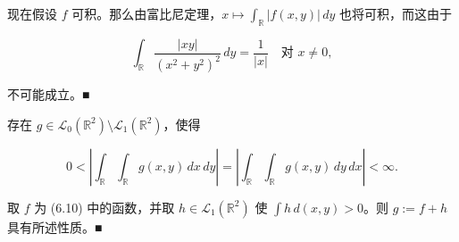 \begin{remark}
\begin{items}
现在假设 $ f $ 可积。那么由富比尼定理，$ x \mapsto \int_{\mathbb{R}}|f(x,y)|\,dy $ 也将可积，而这由于

\[
\int_{\mathbb{R}} \frac{|xy|}{(x^2+y^2)^2}\,dy = \frac{1}{|x|} \quad \text{对 } x \ne 0 ,
\]

不可能成立。\nobreak\hspace{0.35em}■

\item

存在 $ g \in \mathcal{L}_0(\mathbb{R}^2)\setminus\mathcal{L}_1(\mathbb{R}^2) $，使得

\[
0 < \left|\int_{\mathbb{R}}\int_{\mathbb{R}} g(x,y)\,dx\,dy\right| = \left|\int_{\mathbb{R}}\int_{\mathbb{R}} g(x,y)\,dy\,dx\right| < \infty .
\]

\proofhead
取 $ f $ 为 (6.10) 中的函数，并取 $ h \in \mathcal{L}_1(\mathbb{R}^2) $ 使 $ \int h\,d(x,y) > 0 $。则 $ g := f + h $ 具有所述性质。\nobreak\hspace{0.35em}■
\end{items}

\end{remark}

